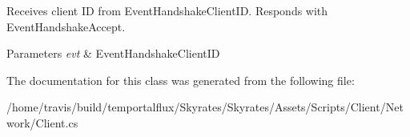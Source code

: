Receives client I\-D from Event\-Handshake\-Client\-I\-D. Responds with Event\-Handshake\-Accept. 


\begin{DoxyParams}{Parameters}
{\em evt} & Event\-Handshake\-Client\-I\-D\\
\hline
\end{DoxyParams}


The documentation for this class was generated from the following file\-:\begin{DoxyCompactItemize}
\item 
/home/travis/build/temportalflux/\-Skyrates/\-Skyrates/\-Assets/\-Scripts/\-Client/\-Network/Client.\-cs\end{DoxyCompactItemize}
